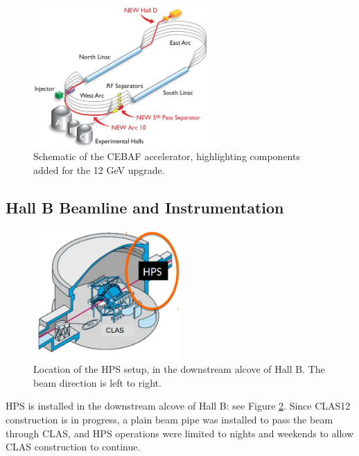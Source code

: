 \begin{figure}[htp]
    \includegraphics[width=0.6\textwidth]{detector/figs/cebaf}
    \caption{Schematic of the CEBAF accelerator, highlighting components added for the 12 GeV upgrade.}
    \label{fig:cebaf}
\end{figure}

\subsection{Hall B Beamline and Instrumentation}
\label{sec:beamline_hallb}

\begin{figure}[htp]
    \begin{center}
        \includegraphics[width=0.5\textwidth]{detector/figs/hallb}
    \end{center}
    \caption{Location of the HPS setup, in the downstream alcove of Hall B.
    The beam direction is left to right.}
    \label{fig:hallb}
\end{figure}

HPS is installed in the downstream alcove of Hall B: see Figure \ref{fig:hallb}.
Since CLAS12 construction is in progress, a plain beam pipe was installed to pass the beam through CLAS, and HPS operations were limited to nights and weekends to allow CLAS construction to continue.

